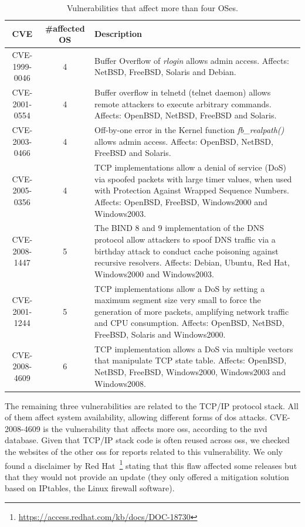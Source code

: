 \begin{table}[!ht]
\begin{center}
{\scriptsize
\begin{tabular}{|c||c| p{} | }\hline
\textbf{CVE} & \#affected OS  & Description  \\\hline\hline
CVE-1999-0046  &  4  & Buffer Overflow of \emph{rlogin} allows admin access. Affects: NetBSD, FreeBSD, Solaris and Debian. \\ \hline
CVE-2001-0554  &  4  & Buffer overflow in telnetd (telnet daemon) allows remote attackers to execute arbitrary commands. Affects: OpenBSD, NetBSD, FreeBSD and Solaris.  \\ \hline
CVE-2003-0466  &  4  & Off-by-one error in the Kernel function \emph{fb\_realpath()} allows admin access. Affects: OpenBSD, NetBSD, FreeBSD and Solaris.  \\ \hline
CVE-2005-0356  &  4  & TCP implementations allow a denial of service (DoS) via spoofed packets with large timer values, when used with Protection Against Wrapped Sequence Numbers. Affects: OpenBSD, FreeBSD, Windows2000 and Windows2003. \\ \hline
CVE-2008-1447  &  5  & The BIND 8 and 9 implementation of the DNS protocol allow attackers to spoof DNS traffic via a birthday attack to conduct cache poisoning against recursive resolvers. Affects: Debian, Ubuntu, Red Hat, Windows2000 and Windows2003.  \\ \hline
CVE-2001-1244  &  5  & TCP implementations allow a DoS by setting a maximum segment size very small to force the generation of more packets, amplifying network traffic and CPU consumption. Affects: OpenBSD, NetBSD, FreeBSD, Solaris and Windows2000. \\ \hline
CVE-2008-4609  &  6  & TCP implementation allows a DoS via multiple vectors that manipulate TCP state table. Affects: OpenBSD, NetBSD, FreeBSD, Windows2000, Windows2003 and Windows2008.   \\ \hline
\end{tabular}
}
\caption{Vulnerabilities that affect more than four OSes.}
\label{tab:spreaded_vulns}
\end{center}
\end{table}


The remaining three vulnerabilities are related to the TCP/IP protocol stack. 
All of them affect system availability, allowing different forms of \gls{dos} attacks. 
CVE-2008-4609 is the vulnerability that affects more \glspl{os}, according to the \gls{nvd} database. 
Given that TCP/IP stack code is often reused across \glspl{os}, we checked the websites of the other \glspl{os} for reports related to this vulnerability. 
We only found a disclaimer by Red Hat~\footnote{\url{https://access.redhat.com/kb/docs/DOC-18730}} stating that this flaw affected some releases but that they would not provide an update (they only offered a mitigation solution based on IPtables, the Linux firewall software).

